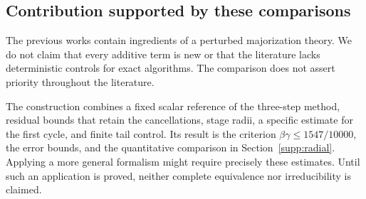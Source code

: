 \documentclass[11pt,a4paper]{article}
\numberwithin{equation}{section}
\numberwithin{table}{section}
\theoremstyle{plain}
\theoremstyle{definition}\newtheorem{definition}[theorem]{Definition}
\theoremstyle{remark}\newtheorem{remark}[theorem]{Remark}
\begin{document}
\subsection{Contribution supported by these comparisons}
The previous works contain ingredients of a perturbed majorization
theory. We do not claim that every additive term is new or that the
literature lacks deterministic controls for exact algorithms.
The comparison does not assert priority throughout the literature.

The construction combines a fixed scalar reference of the three-step
method, residual bounds that retain the cancellations, stage radii,
a specific estimate for the first cycle, and finite tail control.
Its result is the criterion $\beta\gamma\leq1547/10000$, the error
bounds, and the quantitative comparison in Section~\ref{supp:radial}.
Applying a more general formalism might require precisely these
estimates. Until such an application is proved, neither complete
equivalence nor irreducibility is claimed.
\end{document}
